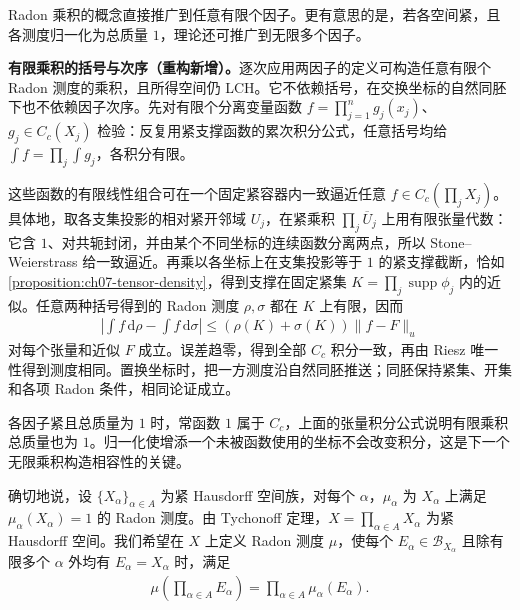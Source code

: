 \documentclass[../../main.tex]{subfiles}
\begin{document}
Radon 乘积的概念直接推广到任意有限个因子。更有意思的是，若各空间紧，且各测度归一化为总质量 $1$，理论还可推广到无限多个因子。
\begin{remark}
\textbf{有限乘积的括号与次序（重构新增）。}逐次应用两因子的定义可构造任意有限个 Radon 测度的乘积，且所得空间仍 LCH。它不依赖括号，在交换坐标的自然同胚下也不依赖因子次序。先对有限个分离变量函数 $f=\prod_{j=1}^ng_j(x_j)$、$g_j\in C_c(X_j)$ 检验：反复用紧支撑函数的累次积分公式，任意括号均给 $\int f=\prod_j\int g_j$，各积分有限。

这些函数的有限线性组合可在一个固定紧容器内一致逼近任意 $f\in C_c(\prod_jX_j)$。具体地，取各支集投影的相对紧开邻域 $U_j$，在紧乘积 $\prod_j\overline U_j$ 上用有限张量代数：它含 $1$、对共轭封闭，并由某个不同坐标的连续函数分离两点，所以 Stone--Weierstrass 给一致逼近。再乘以各坐标上在支集投影等于 $1$ 的紧支撑截断，恰如\cref{proposition:ch07-tensor-density}，得到支撑在固定紧集 $K=\prod_j\operatorname{supp}\phi_j$ 内的近似。任意两种括号得到的 Radon 测度 $\rho,\sigma$ 都在 $K$ 上有限，因而
\begin{align*}
\left|\int f\,\mathrm d\rho-\int f\,\mathrm d\sigma\right|
\leqslant(\rho(K)+\sigma(K))\|f-F\|_u
\end{align*}
对每个张量和近似 $F$ 成立。误差趋零，得到全部 $C_c$ 积分一致，再由 Riesz 唯一性得到测度相同。置换坐标时，把一方测度沿自然同胚推送；同胚保持紧集、开集和各项 Radon 条件，相同论证成立。

各因子紧且总质量为 $1$ 时，常函数 $1$ 属于 $C_c$，上面的张量积分公式说明有限乘积总质量也为 $1$。归一化使增添一个未被函数使用的坐标不会改变积分，这是下一个无限乘积构造相容性的关键。
\end{remark}
确切地说，设 $\{X_\alpha\}_{\alpha\in A}$ 为紧 Hausdorff 空间族，对每个 $\alpha$，$\mu_\alpha$ 为 $X_\alpha$ 上满足 $\mu_\alpha(X_\alpha)=1$ 的 Radon 测度。由 Tychonoff 定理，$X=\prod_{\alpha\in A}X_\alpha$ 为紧 Hausdorff 空间。我们希望在 $X$ 上定义 Radon 测度 $\mu$，使每个 $E_\alpha\in\mathscr B_{X_\alpha}$ 且除有限多个 $\alpha$ 外均有 $E_\alpha=X_\alpha$ 时，满足
\begin{align*}
\mu\left(\prod_{\alpha\in A}E_\alpha\right)=\prod_{\alpha\in A}\mu_\alpha(E_\alpha).
\end{align*}
\end{document}
